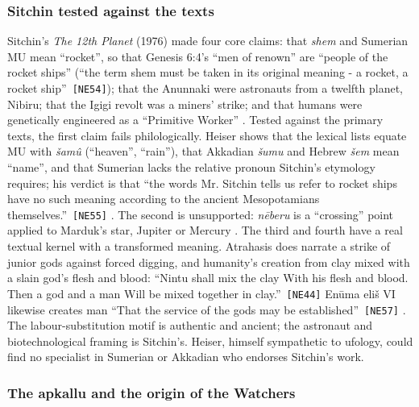 \documentclass[11pt,a4paper]{article}
\newcommand{\pid}[1]{\texttt{\small #1}}
\begin{document}
\subsubsection{Sitchin tested against the texts}

Sitchin's \emph{The 12th Planet} (1976) made four core claims: that \emph{shem} and Sumerian MU mean ``rocket'', so that Genesis 6:4's ``men of renown'' are ``people of the rocket ships'' (\enquote{the term shem must be taken in its original meaning - a rocket, a rocket ship}~\pid{[NE54]}); that the Anunnaki were astronauts from a twelfth planet, Nibiru; that the Igigi revolt was a miners' strike; and that humans were genetically engineered as a ``Primitive Worker'' \parencite{sitchin1976planet}. Tested against the primary texts, the first claim fails philologically. Heiser shows that the lexical lists equate MU with \emph{šamû} (``heaven'', ``rain''), that Akkadian \emph{šumu} and Hebrew \emph{šem} mean ``name'', and that Sumerian lacks the relative pronoun Sitchin's etymology requires; his verdict is that \enquote{the words Mr. Sitchin tells us refer to rocket ships have no such meaning according to the ancient Mesopotamians themselves.}~\pid{[NE55]} \parencite{heiser_sitchin_rockets}. The second is unsupported: \emph{nēberu} is a ``crossing'' point applied to Marduk's star, Jupiter or Mercury \parencite{heiser_nibiru,horowitz1998cosmic}. The third and fourth have a real textual kernel with a transformed meaning. Atrahasis does narrate a strike of junior gods against forced digging, and humanity's creation from clay mixed with a slain god's flesh and blood: \enquote{Nintu shall mix the clay With his flesh and blood. Then a god and a man Will be mixed together in clay.}~\pid{[NE44]} Enūma eliš VI likewise creates man \enquote{That the service of the gods may be established}~\pid{[NE57]} \parencite{king1902seven}. The labour-substitution motif is authentic and ancient; the astronaut and biotechnological framing is Sitchin's. Heiser, himself sympathetic to ufology, could find no specialist in Sumerian or Akkadian who endorses Sitchin's work.

\subsubsection{The apkallu and the origin of the Watchers}
\end{document}
